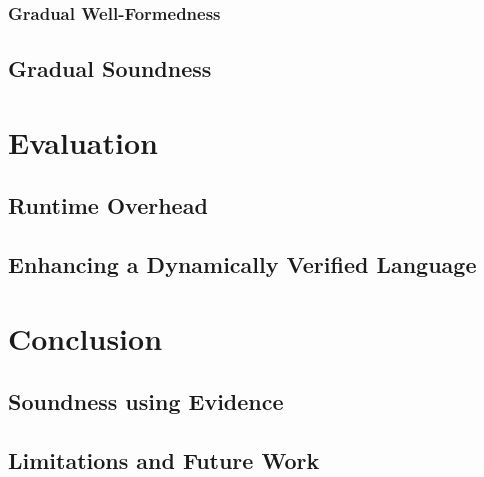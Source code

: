 \subsection{Gradual Well-Formedness}
\label{ssec:well-formedness}


\section{Gradual Soundness}
\label{sec:gradual-soundness}




\chapter{Evaluation}
\label{ch:evaluation-analysis}


\section{Runtime Overhead}
\label{sec:runtime-overhead}


\section{Enhancing a Dynamically Verified Language}
\label{sec:enhancing-an-unverified}



\chapter{Conclusion}
\label{ch:conclusion}


\section{Soundness using Evidence}
\label{sec:soundness-using-evidence}


\section{Limitations and Future Work}
\label{sec:future-work}



